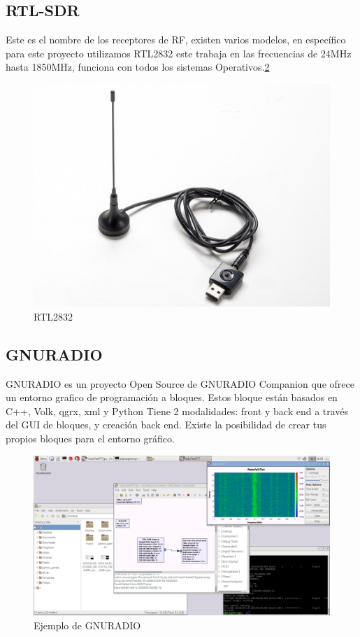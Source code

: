 \documentclass[preprint,12pt]{elsarticle}
\begin{document}
\subsection{RTL-SDR}
Este es el nombre de los receptores de RF, existen varios modelos, en específico para este proyecto utilizamos RTL2832 este trabaja en las frecuencias de 24MHz hasta 1850MHz, funciona con todos los sistemas Operativos.\ref{rtl}

\begin{figure}[h]
\centering\includegraphics[width=0.2\linewidth]{RTL.jpg}
\caption{RTL2832}
\label{rtl}
\end{figure}


\subsection{GNURADIO}
 GNURADIO es un proyecto Open Source de GNURADIO Companion que ofrece un entorno grafico de programación a bloques. Estos bloque están basados en C++, Volk, qgrx, xml y Python Tiene 2 modalidades: front y back end a través del GUI de bloques, y creación back end. Existe la posibilidad de crear tus propios bloques para el entorno gráfico.
\begin{figure}[h]
\centering\includegraphics[width=0.4\linewidth]{2016-04-02-020310_1824x984_scrot.png}
\caption{Ejemplo de GNURADIO}
\label{rtl}
\end{figure}


\end{document}

